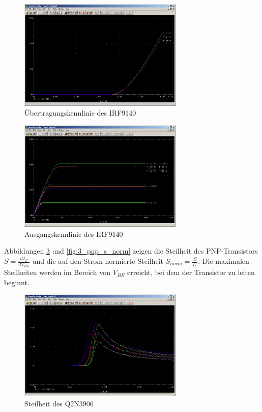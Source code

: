 \begin{figure}[h!]
	\centering
	\includegraphics[width=0.70\textwidth]{fig/ue2_ex3_pmos_transfer.PNG}
	\caption{Übertragungskennlinie des IRF9140}
	\label{fig:3_pmos_transfer}
\end{figure}

\begin{figure}[h!]
	\centering
	\includegraphics[width=0.70\textwidth]{fig/ue2_ex3_pmos_output.PNG}
	\caption{Ausgangskennlinie des IRF9140}
	\label{fig:3_pmos_output}
\end{figure}


Abbildungen \ref{fig:3_pnp_s} und \ref{fig:3_pnp_s_norm} zeigen die Steilheit des PNP-Transistors $S = \frac{dI_C}{dV_{BE}}$ und die auf den Strom normierte Steilheit $S_{norm} = \frac{S}{I_C}$. Die maximalen Steilheiten werden im Bereich von $V_{BE}$ erreicht, bei dem der Transistor zu leiten beginnt.

\begin{figure}[h!]
	\centering
	\includegraphics[width=0.70\textwidth]{fig/ue2_ex3_pnp_s.PNG}
	\caption{Steilheit des Q2N3906}
	\label{fig:3_pnp_s}
\end{figure}

